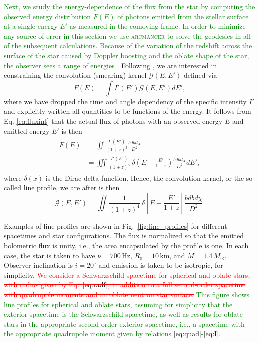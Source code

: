 \documentclass{aa}
\newcommand{\be}{\begin{equation}}
\newcommand{\ee}{\end{equation}}
\newcommand{\refe}[1]{\textcolor{green}{{#1}}}
\newcommand{\refedel}[1]{\textcolor{red}{\sout{#1}}}
\newcommand{\sch}{Schwarzschild }
\newcommand{\Msun}{\ensuremath{M_{\odot}}}
\begin{document}
\refe{Next, we study the energy-dependence of the flux from the star by computing the observed energy distribution $F(E)$ of photons emitted from the stellar surface at a single energy $E'$ as measured in the comoving frame. 
\refe{In order to minimize any source of error in this section we use \textsc{arcmancer} to solve the geodesics in all of the subsequent calculations.}
Because of the variation of the redshift across the surface of the star caused by Doppler boosting and the oblate shape of the star, the observer sees a range of energies} \citep{OP03,BML06,CMB06}.
Following \citealt{Baubock15}, we are interested in constraining the convolution (smearing) kernel $\mathcal{G}(E,E')$ defined via
\be
F(E) = \int I'(E') \mathcal{G}(E,E') dE',
\ee
where we have dropped the time and angle dependency of the specific intensity $I'$ and explicitly written all quantities to be functions of the energy.
It follows from Eq. \eqref{eq:fluxint} that the actual flux of photons with an observed energy $E$ and emitted energy $E'$ is then
\begin{align}\begin{split}
    F(E) &= \iint \frac{ I'(E') }{ (1+z)^3 } \frac{bdb d\chi}{D^2} \\
         &= \iiint \frac{I'(E') }{(1+z)^4} ~ \delta \left( E - \frac{E'}{1+z} \right)  \frac{bdb d\chi}{D^2} dE',
\end{split}\end{align}
where $\delta(x)$ is the Dirac delta function.
Hence, the convolution kernel, or the so-called line profile, we are after is then 
\be
\mathcal{G}(E,E') =  \iint \frac{1}{(1+z)^4} ~\delta \left[E - \frac{E'}{1+z} \right]  \frac{bdb d\chi}{D^2}.
\ee

Examples of line profiles are shown in Fig.~\ref{fig:line_profiles} for different spacetimes and star configurations.
The flux is normalized so that the emitted bolometric flux is unity, i.e., the area encapsulated by the profile is one.
In each case, the star is taken to have $\nu = 700\,\mathrm{Hz}$, $R_{\mathrm{e}} = 10\,\mathrm{km}$, and $M=1.4\,\Msun$.
Observer inclination is $i=20^{\circ}$ and emission is taken to be isotropic, for simplicity.
\refedel{We consider a \sch spacetime for spherical and oblate stars, with radius given by Eq.~\eqref{eq:radf}, in addition to a full second-order spacetime with quadrupole moments and an oblate neutron star surface.}
\refe{
This figure shows line profiles for spherical and oblate stars, assuming for simplicity that the exterior spacetime is the Schwarzschild spacetime, as well as results for oblate stars in the appropriate second-order exterior spacetime, 
i.e., a spacetime with the appropriate quadrupole moment given by relations \eqref{eq:quad}-\eqref{eq:I}.
}
\end{document}

